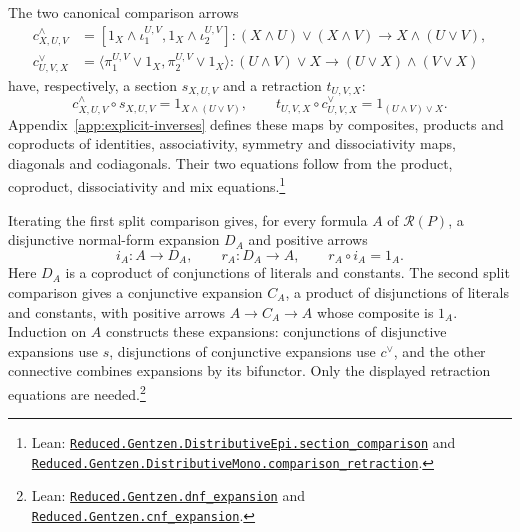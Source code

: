 \documentclass[11pt]{article}
\begin{document}
The two canonical comparison arrows
\[
 \begin{aligned}
 c^\wedge_{X,U,V}
 &=[1_X\wedge\iota_1^{U,V},1_X\wedge\iota_2^{U,V}]
 :(X\wedge U)\vee(X\wedge V)\longrightarrow X\wedge(U\vee V),\\
 c^\vee_{U,V,X}
 &=\langle\pi_1^{U,V}\vee1_X,\pi_2^{U,V}\vee1_X\rangle
 :(U\wedge V)\vee X\longrightarrow(U\vee X)\wedge(V\vee X)
 \end{aligned}
\]
have, respectively, a section $s_{X,U,V}$ and a retraction
$t_{U,V,X}$:
\[
 c^\wedge_{X,U,V}\circ s_{X,U,V}=1_{X\wedge(U\vee V)},\qquad
 t_{U,V,X}\circ c^\vee_{U,V,X}=1_{(U\wedge V)\vee X}.
\]
Appendix~\ref{app:explicit-inverses} defines these maps by
composites, products and coproducts of identities, associativity,
symmetry and dissociativity maps, diagonals and codiagonals.
Their two equations follow from the
product, coproduct, dissociativity and mix equations.\footnote{\raggedright Lean:
\href{https://github.com/flengyel/Dosen-Petric-Maximality/blob/5dbee39bea09539bd130f729e82636419f71f920/DosenPetric/GentzenDistributiveEpi.lean\#L57}{\texttt{Reduced.Gentzen.DistributiveEpi.\allowbreak{}section\_comparison}}
and
\href{https://github.com/flengyel/Dosen-Petric-Maximality/blob/5dbee39bea09539bd130f729e82636419f71f920/DosenPetric/GentzenDistributiveMono.lean\#L54}{\texttt{Reduced.Gentzen.DistributiveMono.\allowbreak{}comparison\_retraction}}.}

Iterating the first split comparison gives, for every formula $A$
of $\mathcal R(P)$, a disjunctive normal-form expansion $D_A$
and positive arrows
\[
 i_A:A\longrightarrow D_A,\qquad r_A:D_A\longrightarrow A,
 \qquad r_A\circ i_A=1_A.
\]
Here $D_A$ is a coproduct of conjunctions of literals and constants.
The second split comparison gives a conjunctive expansion $C_A$,
a product of disjunctions of literals and constants, with positive
arrows $A\to C_A\to A$ whose composite is $1_A$.
Induction on $A$ constructs these expansions: conjunctions of
disjunctive expansions use $s$, disjunctions of conjunctive
expansions use $c^\vee$, and the other connective combines
expansions by its bifunctor.
Only the displayed retraction equations are needed.\footnote{\raggedright Lean:
\href{https://github.com/flengyel/Dosen-Petric-Maximality/blob/5dbee39bea09539bd130f729e82636419f71f920/DosenPetric/GentzenNormalExpansion.lean\#L45}{\texttt{Reduced.Gentzen.\allowbreak{}dnf\_expansion}} and
\href{https://github.com/flengyel/Dosen-Petric-Maximality/blob/5dbee39bea09539bd130f729e82636419f71f920/DosenPetric/GentzenNormalExpansion.lean\#L62}{\texttt{Reduced.Gentzen.\allowbreak{}cnf\_expansion}}.}
\end{document}
